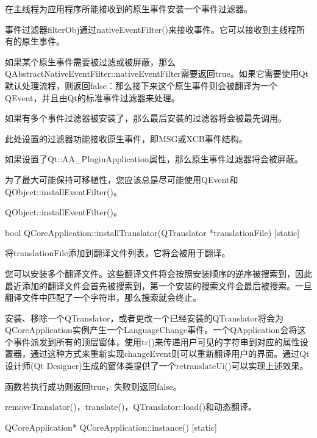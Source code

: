 在主线程为应用程序所能接收到的原生事件安装一个事件过滤器。

事件过滤器filterObj通过nativeEventFilter()来接收事件。它可以接收到主线程所有的原生事件。

如果某个原生事件需要被过滤或被屏蔽，那么QAbstractNativeEventFilter::nativeEventFilter需要返回true。如果它需要使用Qt默认处理流程，则返回false：那么接下来这个原生事件则会被翻译为一个QEvent，并且由Qt的标准事件过滤器来处理。

如果有多个事件过滤器被安装了，那么最后安装的过滤器将会被最先调用。


\begin{notice}
 此处设置的过滤器功能接收原生事件，即MSG或XCB事件结构。
\end{notice}


\begin{notice}
如果设置了Qt::AA\_PluginApplication属性，那么原生事件过滤器将会被屏蔽。
\end{notice}


为了最大可能保持可移植性，您应该总是尽可能使用QEvent和QObject::installEventFilter()。



\begin{seeAlso}
QObject::installEventFilter()。
\end{seeAlso}

bool QCoreApplication::installTranslator(QTranslator *translationFile) [static]

将translationFile添加到翻译文件列表，它将会被用于翻译。

您可以安装多个翻译文件。这些翻译文件将会按照安装顺序的逆序被搜索到，因此最近添加的翻译文件会首先被搜索到，第一个安装的搜索文件会最后被搜索。一旦翻译文件中匹配了一个字符串，那么搜索就会终止。

安装、移除一个QTranslator，或者更改一个已经安装的QTranslator将会为QCoreApplication实例产生一个LanguageChange事件。一个QApplication会将这个事件派发到所有的顶层窗体，使用tr()来传递用户可见的字符串到对应的属性设置器，通过这种方式来重新实现changeEvent则可以重新翻译用户的界面。通过Qt设计师(Qt Designer)生成的窗体类提供了一个retranslateUi()可以实现上述效果。

函数若执行成功则返回true，失败则返回false。



\begin{seeAlso}
removeTranslator()，translate()，QTranslator::load()和动态翻译。
\end{seeAlso}

QCoreApplication* QCoreApplication::instance() [static]

